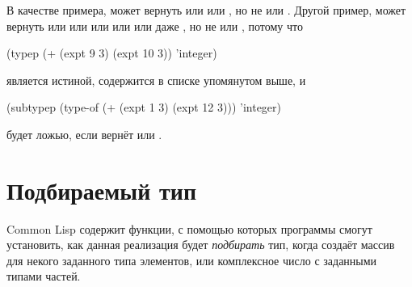 \begin{defun}[Функция]
В качестве примера,  может вернуть
 или  или , но не
 или .
Другой пример,  может вернуть  или 
или  или  или  или даже , но не  или , потому что
\begin{lisp}
(typep (+ (expt 9 3) (expt 10 3)) 'integer)
\end{lisp}

является истиной,  содержится в списке упомянутом выше, и 

\begin{lisp}
(subtypep (type-of (+ (expt 1 3) (expt 12 3))) 'integer)
\end{lisp}

будет ложью, если  вернёт  или .

\end{defun}

\section{Подбираемый тип}

Common Lisp содержит функции, с помощью которых программы смогут установить, как
данная реализация будет \emph{подбирать} тип, когда создаёт массив для некого
заданного типа элементов, или комплексное число с заданными типами частей.

